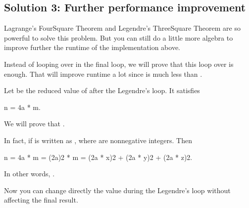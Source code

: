 \documentclass[letterpaper,12pt,english]{book}
\begin{document}
\subsection{Solution 3: Further performance improvement}
\label{\detokenize{Mathematics/09_MTH_279_Perfect_Squares:solution-3-further-performance-improvement}}
\sphinxAtStartPar
Lagrange’s Four\sphinxhyphen{}Square Theorem and Legendre’s Three\sphinxhyphen{}Square Theorem are so powerful to solve this problem. But you can still do a little more algebra to improve further the runtime of the implementation above.

\sphinxAtStartPar
Instead of looping over  in the final  loop, we will prove that this loop over  is enough. That will improve runtime a lot since  is much less than .

\sphinxAtStartPar
Let  be the reduced value of  after the Legendre’s  loop. It satisfies

\begin{sphinxVerbatim}[commandchars=\\\{\}]
n = 4\PYGZca{}a * m.
\end{sphinxVerbatim}

\sphinxAtStartPar
We will prove that .

\sphinxAtStartPar
In fact, if  is written as , where  are nonnegative integers. Then

\begin{sphinxVerbatim}[commandchars=\\\{\}]
n = 4\PYGZca{}a * m = (2\PYGZca{}a)\PYGZca{}2 * m = (2\PYGZca{}a * x)\PYGZca{}2 + (2\PYGZca{}a * y)\PYGZca{}2 + (2\PYGZca{}a * z)\PYGZca{}2.
\end{sphinxVerbatim}

\sphinxAtStartPar
In other words, .

\sphinxAtStartPar
Now you can change directly the value  during the Legendre’s  loop without affecting the final result.
\end{document}
